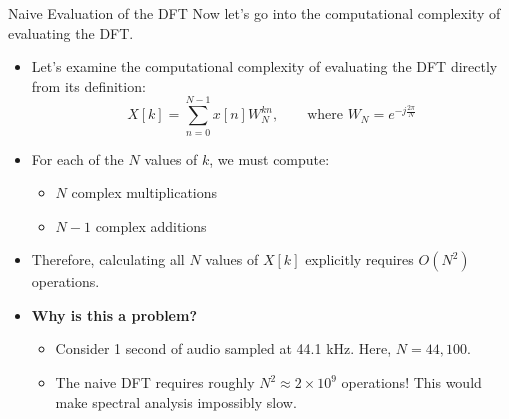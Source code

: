 \begin{frame}{Naive Evaluation of the DFT}
    Now let's go into the computational complexity of evaluating the DFT.
    \begin{itemize}
        \item Let's examine the computational complexity of evaluating the DFT directly from its definition:
              \begin{equation*}
                  X[k] = \sum_{n=0}^{N-1} x[n]W_N^{kn}, \qquad \text{where } W_N = e^{-j\frac{2\pi}{N}}
              \end{equation*}
        \item For each of the $N$ values of $k$, we must compute:
              \begin{itemize}
                  \item $N$ complex multiplications
                  \item $N-1$ complex additions
              \end{itemize}
        \item Therefore, calculating all $N$ values of $X[k]$ explicitly requires \textbf{$O(N^2)$} operations.
        \item \textbf{Why is this a problem?}
              \begin{itemize}
                  \item Consider 1 second of audio sampled at 44.1 kHz. Here, $N = 44,100$.
                  \item The naive DFT requires roughly $N^2 \approx 2 \times 10^9$ operations!
                        This would make spectral analysis impossibly slow.
              \end{itemize}
    \end{itemize}
\end{frame}

